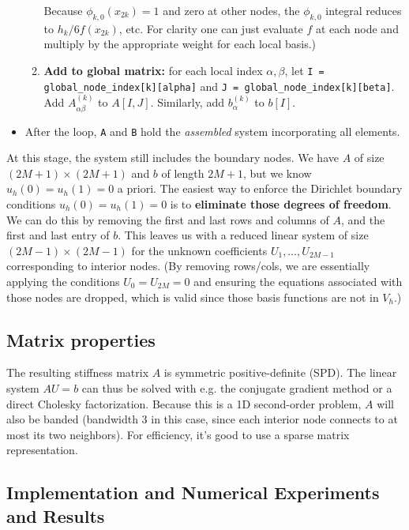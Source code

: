 \documentclass[a4paper,10pt]{article}
\begin{document}
\begin{itemize}
\begin{enumerate}
		            Because \(\phi_{k,0}(x_{2k})=1\) and zero at other nodes, the \(\phi_{k,0}\) integral reduces to \(h_k/6 f(x_{2k})\), etc.
		            For clarity one can just evaluate \(f\) at each node and multiply by the appropriate weight for each local basis.)
		      \item \textbf{Add to global matrix:} for each local index \(\alpha,\beta\), let \texttt{I = global_node_index[k][alpha]} and \texttt{J = global_node_index[k][beta]}.
		            Add \(A^{(k)}_{\alpha\beta}\) to \(A[I,J]\).
		            Similarly, add \(b^{(k)}_{\alpha}\) to \(b[I]\).
	      \end{enumerate}
	\item  After the loop, \texttt{A} and \texttt{B} hold the \emph{assembled} system incorporating all elements.
\end{itemize}

At this stage, the system still includes the boundary nodes. We have \(A\) of size \((2M+1)\times(2M+1)\) and \(b\) of length \(2M+1\), but we know \(u_h(0)=u_h(1)=0\) a priori.
The easiest way to enforce the Dirichlet boundary conditions \(u_h(0)=u_h(1)=0\) is to \textbf{eliminate those degrees of freedom}.
We can do this by removing the first and last rows and columns of \(A\), and the first and last entry of \(b\).
This leaves us with a reduced linear system of size \((2M-1)\times(2M-1)\) for the unknown coefficients \(U_1,\dots,U_{2M-1}\) corresponding to interior nodes. (By removing rows/cols, we are essentially applying the conditions \(U_0=U_{2M}=0\) and ensuring the equations associated with those nodes are dropped, which is valid since those basis functions are not in \(V_h\).)

\subsection*{Matrix properties}
The resulting stiffness matrix \(A\) is symmetric positive-definite (SPD).
The linear system \(A U = b\) can thus be solved with e.g. the conjugate gradient method or a direct Cholesky factorization.
Because this is a 1D second-order problem, \(A\) will also be banded (bandwidth 3 in this case, since each interior node connects to at most its two neighbors).
For efficiency, it's good to use a sparse matrix representation.

\subsection{Implementation and Numerical Experiments and Results}
\end{document}

